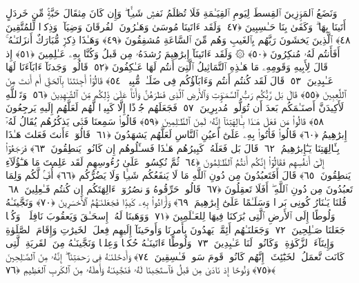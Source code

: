  وَنَضَعُ ٱلمَوَٟزِينَ ٱلقِسطَ لِيَومِ ٱلقِيَـٰمَةِ فَلَا تُظلَمُ نَفسٌۭ شَيـًۭٔا ۖ وَإِن كَانَ مِثقَالَ حَبَّةٍۢ مِّن خَردَلٍ أَتَينَا بِهَا ۗ وَكَفَىٰ بِنَا حَـٰسِبِينَ ﴿٤٧﴾
 وَلَقَد ءَاتَينَا مُوسَىٰ وَهَـٰرُونَ ٱلفُرقَانَ وَضِيَآءًۭ وَذِكرًۭا لِّلمُتَّقِينَ ﴿٤٨﴾
 ٱلَّذِينَ يَخشَونَ رَبَّهُم بِٱلغَيبِ وَهُم مِّنَ ٱلسَّاعَةِ مُشفِقُونَ ﴿٤٩﴾
 وَهَـٰذَا ذِكرٌۭ مُّبَارَكٌ أَنزَلنَـٰهُ ۚ أَفَأَنتُم لَهُۥ مُنكِرُونَ ﴿٥٠﴾
 ۞ وَلَقَد ءَاتَينَآ إِبرَٰهِيمَ رُشدَهُۥ مِن قَبلُ وَكُنَّا بِهِۦ عَـٰلِمِينَ ﴿٥١﴾
 إِذ قَالَ لِأَبِيهِ وَقَومِهِۦ مَا هَـٰذِهِ ٱلتَّمَاثِيلُ ٱلَّتِىٓ أَنتُم لَهَا عَـٰكِفُونَ ﴿٥٢﴾
 قَالُوا۟ وَجَدنَآ ءَابَآءَنَا لَهَا عَـٰبِدِينَ ﴿٥٣﴾
 قَالَ لَقَد كُنتُم أَنتُم وَءَابَآؤُكُم فِى ضَلَـٰلٍۢ مُّبِينٍۢ ﴿٥٤﴾
 قَالُوٓا۟ أَجِئتَنَا بِٱلحَقِّ أَم أَنتَ مِنَ ٱللَّٰعِبِينَ ﴿٥٥﴾
 قَالَ بَل رَّبُّكُم رَبُّ ٱلسَّمَـٰوَٟتِ وَٱلأَرضِ ٱلَّذِى فَطَرَهُنَّ وَأَنَا۠ عَلَىٰ ذَٟلِكُم مِّنَ ٱلشَّـٰهِدِينَ ﴿٥٦﴾
 وَتَٱللَّهِ لَأَكِيدَنَّ أَصنَـٰمَكُم بَعدَ أَن تُوَلُّوا۟ مُدبِرِينَ ﴿٥٧﴾
 فَجَعَلَهُم جُذَٟذًا إِلَّا كَبِيرًۭا لَّهُم لَعَلَّهُم إِلَيهِ يَرجِعُونَ ﴿٥٨﴾
 قَالُوا۟ مَن فَعَلَ هَـٰذَا بِـَٔالِهَتِنَآ إِنَّهُۥ لَمِنَ ٱلظَّـٰلِمِينَ ﴿٥٩﴾
 قَالُوا۟ سَمِعنَا فَتًۭى يَذكُرُهُم يُقَالُ لَهُۥٓ إِبرَٰهِيمُ ﴿٦٠﴾
 قَالُوا۟ فَأتُوا۟ بِهِۦ عَلَىٰٓ أَعيُنِ ٱلنَّاسِ لَعَلَّهُم يَشهَدُونَ ﴿٦١﴾
 قَالُوٓا۟ ءَأَنتَ فَعَلتَ هَـٰذَا بِـَٔالِهَتِنَا يَـٰٓإِبرَٰهِيمُ ﴿٦٢﴾
 قَالَ بَل فَعَلَهُۥ كَبِيرُهُم هَـٰذَا فَسـَٔلُوهُم إِن كَانُوا۟ يَنطِقُونَ ﴿٦٣﴾
 فَرَجَعُوٓا۟ إِلَىٰٓ أَنفُسِهِم فَقَالُوٓا۟ إِنَّكُم أَنتُمُ ٱلظَّـٰلِمُونَ ﴿٦٤﴾
 ثُمَّ نُكِسُوا۟ عَلَىٰ رُءُوسِهِم لَقَد عَلِمتَ مَا هَـٰٓؤُلَآءِ يَنطِقُونَ ﴿٦٥﴾
 قَالَ أَفَتَعبُدُونَ مِن دُونِ ٱللَّهِ مَا لَا يَنفَعُكُم شَيـًۭٔا وَلَا يَضُرُّكُم ﴿٦٦﴾
 أُفٍّۢ لَّكُم وَلِمَا تَعبُدُونَ مِن دُونِ ٱللَّهِ ۖ أَفَلَا تَعقِلُونَ ﴿٦٧﴾
 قَالُوا۟ حَرِّقُوهُ وَٱنصُرُوٓا۟ ءَالِهَتَكُم إِن كُنتُم فَـٰعِلِينَ ﴿٦٨﴾
 قُلنَا يَـٰنَارُ كُونِى بَردًۭا وَسَلَـٰمًا عَلَىٰٓ إِبرَٰهِيمَ ﴿٦٩﴾
 وَأَرَادُوا۟ بِهِۦ كَيدًۭا فَجَعَلنَـٰهُمُ ٱلأَخسَرِينَ ﴿٧٠﴾
 وَنَجَّينَـٰهُ وَلُوطًا إِلَى ٱلأَرضِ ٱلَّتِى بَٰرَكنَا فِيهَا لِلعَـٰلَمِينَ ﴿٧١﴾
 وَوَهَبنَا لَهُۥٓ إِسحَـٰقَ وَيَعقُوبَ نَافِلَةًۭ ۖ وَكُلًّۭا جَعَلنَا صَـٰلِحِينَ ﴿٧٢﴾
 وَجَعَلنَـٰهُم أَئِمَّةًۭ يَهدُونَ بِأَمرِنَا وَأَوحَينَآ إِلَيهِم فِعلَ ٱلخَيرَٰتِ وَإِقَامَ ٱلصَّلَوٰةِ وَإِيتَآءَ ٱلزَّكَوٰةِ ۖ وَكَانُوا۟ لَنَا عَـٰبِدِينَ ﴿٧٣﴾
 وَلُوطًا ءَاتَينَـٰهُ حُكمًۭا وَعِلمًۭا وَنَجَّينَـٰهُ مِنَ ٱلقَريَةِ ٱلَّتِى كَانَت تَّعمَلُ ٱلخَبَٰٓئِثَ ۗ إِنَّهُم كَانُوا۟ قَومَ سَوءٍۢ فَـٰسِقِينَ ﴿٧٤﴾
 وَأَدخَلنَـٰهُ فِى رَحمَتِنَآ ۖ إِنَّهُۥ مِنَ ٱلصَّـٰلِحِينَ ﴿٧٥﴾
 وَنُوحًا إِذ نَادَىٰ مِن قَبلُ فَٱستَجَبنَا لَهُۥ فَنَجَّينَـٰهُ وَأَهلَهُۥ مِنَ ٱلكَربِ ٱلعَظِيمِ ﴿٧٦﴾
